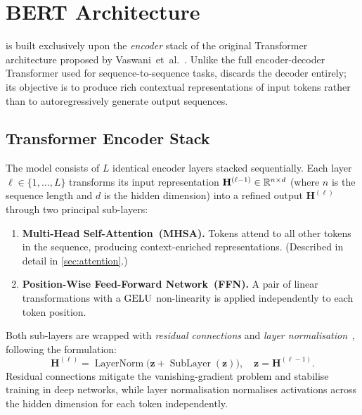 
\section{BERT Architecture}
\label{sec:architecture}

\bert{} is built exclusively upon the \emph{encoder} stack of the original
Transformer architecture proposed by Vaswani~et~al.~\cite{vaswani2017attention}.
Unlike the full encoder-decoder Transformer used for sequence-to-sequence tasks,
\bert{} discards the decoder entirely; its objective is to produce rich contextual
representations of input tokens rather than to autoregressively generate output
sequences.

\subsection{Transformer Encoder Stack}
\label{subsec:encoder}

The model consists of $L$ identical encoder layers stacked sequentially.  Each
layer $\ell \in \{1, \ldots, L\}$ transforms its input representation
$\mathbf{H}^{(\ell-1)} \in \mathbb{R}^{n \times d}$ (where $n$ is the sequence length and
$d$ is the hidden dimension) into a refined output $\mathbf{H}^{(\ell)}$ through
two principal sub-layers:

\begin{enumerate}
  \item \textbf{Multi-Head Self-Attention~(MHSA).}  Tokens attend to all other
        tokens in the sequence, producing context-enriched representations.
        (Described in detail in \cref{sec:attention}.)

  \item \textbf{Position-Wise Feed-Forward Network~(FFN).}  A pair of linear
        transformations with a $\operatorname{GELU}$ non-linearity is applied independently to
        each token position.
\end{enumerate}

\noindent Both sub-layers are wrapped with \emph{residual connections} and
\emph{layer normalisation}~\cite{ba2016layer}, following the formulation:
\begin{equation}
  \mathbf{H}^{(\ell)} = \operatorname{LayerNorm}\!\bigl(
    \mathbf{z} + \operatorname{SubLayer}(\mathbf{z})
  \bigr), \quad \mathbf{z} = \mathbf{H}^{(\ell-1)}.
  \label{eq:residual}
\end{equation}
Residual connections mitigate the vanishing-gradient problem and stabilise training
in deep networks, while layer normalisation normalises activations across the hidden
dimension for each token independently.

